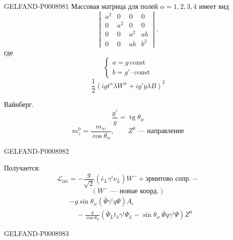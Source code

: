 \begin{GelfandAdjacentEvidence}{GELFAND-P000898}{1}
Массовая матрица для полей $\alpha=1,2,3,4$ имеет вид
\begin{equation*}
\begin{vmatrix}
a^2 & 0 & 0 & 0\\
0 & a^2 & 0 & 0\\
0 & 0 & a^2 & ab\\
0 & 0 & ab & b^2
\end{vmatrix},
\tag{33}
\end{equation*}
где
\begin{equation*}
\begin{cases}
a=g\,\mathrm{const}\\
b=g'\cdot\mathrm{const}
\end{cases}
\tag{34}
\end{equation*}
\begin{equation*}
\frac12\left(igt^\alpha\lambda W^\alpha+ig'y\lambda B\right)^2 \tag{35}
\end{equation*}

Вайнберг.
\begin{equation*}
\frac{g'}{g}=\operatorname{tg}\theta_w \tag{36}
\end{equation*}
\[
m_z^0=\frac{m_w}{\cos\theta_w},\qquad Z^0\text{ — направление}
\]
\end{GelfandAdjacentEvidence}
\begin{GelfandAdjacentEvidence}{GELFAND-P000898}{2}


Получается:
\begin{equation*}
\mathcal L_{\mathrm{int}}
=-\frac{g}{\sqrt2}\left(\bar e_L\gamma^i\nu_L\right)W^-
+\text{эрмитово сопр.}- \tag{37}
\end{equation*}
\[
\left(W^-\text{ — новые коорд.}\right)
\]
\[
\begin{aligned}
&-g\sin\theta_w\left(\bar\Psi\gamma^i q\Psi\right)A_i\\
&\quad-\frac{q}{\cos\theta_w}
  \left(\bar\Psi_Lt_3\gamma^i\Psi_L-\sin\theta_w\,\bar\Psi q\gamma^i\Psi\right)Z^0
\end{aligned}
\]
\end{GelfandAdjacentEvidence}
\begin{GelfandAdjacentEvidence}{GELFAND-P000898}{3}

\end{GelfandAdjacentEvidence}
